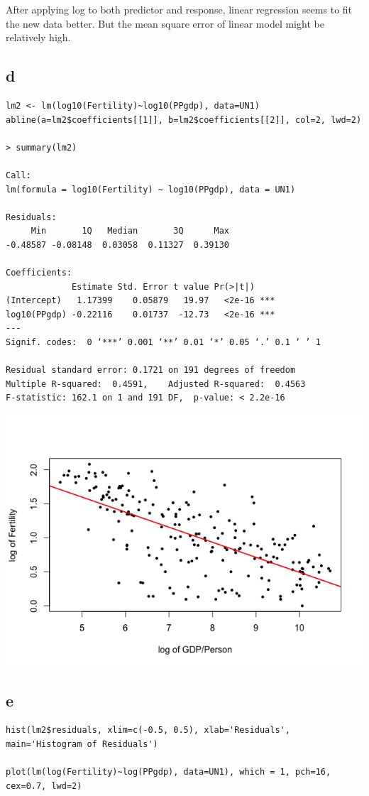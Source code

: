 \documentclass[11pt,letterpaper]{article}
\begin{document}
\noindent After applying log to both predictor and response, linear regression seems to fit the new data better. But the mean square error of linear model might be relatively high. 

\subsection*{d}
\begin{verbatim}
lm2 <- lm(log10(Fertility)~log10(PPgdp), data=UN1)
abline(a=lm2$coefficients[[1]], b=lm2$coefficients[[2]], col=2, lwd=2)

> summary(lm2)

Call:
lm(formula = log10(Fertility) ~ log10(PPgdp), data = UN1)

Residuals:
     Min       1Q   Median       3Q      Max 
-0.48587 -0.08148  0.03058  0.11327  0.39130 

Coefficients:
             Estimate Std. Error t value Pr(>|t|)    
(Intercept)   1.17399    0.05879   19.97   <2e-16 ***
log10(PPgdp) -0.22116    0.01737  -12.73   <2e-16 ***
---
Signif. codes:  0 ‘***’ 0.001 ‘**’ 0.01 ‘*’ 0.05 ‘.’ 0.1 ‘ ’ 1

Residual standard error: 0.1721 on 191 degrees of freedom
Multiple R-squared:  0.4591,	Adjusted R-squared:  0.4563 
F-statistic: 162.1 on 1 and 191 DF,  p-value: < 2.2e-16
\end{verbatim}

\includegraphics[scale=0.6]{2-d-1.png}

\subsection*{e}
\begin{verbatim}
hist(lm2$residuals, xlim=c(-0.5, 0.5), xlab='Residuals', main='Histogram of Residuals')

plot(lm(log(Fertility)~log(PPgdp), data=UN1), which = 1, pch=16, cex=0.7, lwd=2)
\end{verbatim}
\end{document}

